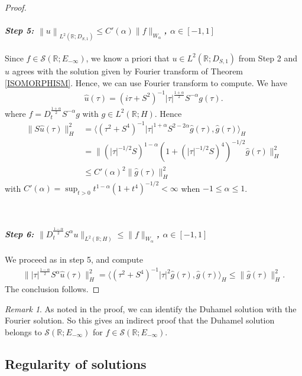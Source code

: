 \documentclass[11pt, letterpaper]{amsart}
\theoremstyle{definition}
\theoremstyle{remark}
\newtheorem{rem}[thm]{Remark}
\numberwithin{equation}{section}
\begin{document}
\begin{proof}
\paragraph{\textit{Step 5:  $\left\|u \right\|_{L^2(\mathbb{R}; D_{S,1})}\le C'(\alpha) \|f\|_{W_{\alpha}}$, $ \alpha\in [-1,1]$}}
Since $f\in \mathcal{S}(\mathbb{R}; E_{-\infty})$, we know a priori that $u\in L^2(\mathbb{R}; D_{S,1})$ from Step 2 and $u$ agrees with the solution given by Fourier transform of Theorem \ref{ISOMORPHISM}. Hence, we can use Fourier transform to compute. We have 
\begin{align*}
    \hat{u}(\tau) = ({i}\tau +S^2)^{-1} \left | \tau  \right |^{\frac{1+\alpha}{2} }S^{-\alpha}g(\tau).
\end{align*}
where $f=D_t^{\frac{1+\alpha}{2}}S^{-\alpha}g$ with $g\in L^2(\mathbb{R}; H)$.
Hence
\begin{align*}
    \|S\hat u(\tau)\|^2_H
&= \langle (\tau^2+S^4)^{-1} |\tau|^{1+\alpha}S^{2-2\alpha} \hat g(\tau), \hat g(\tau)
\rangle_H \\
&= \|(|\tau|^{-1/2}S)^{1-\alpha}(1+(|\tau|^{-1/2}S)^4)^{-1/2}\hat g(\tau)\|_H^2 
\\
&
\le C'(\alpha)^2 \|\hat g(\tau)\|_H
^2
\end{align*}
with $C'(\alpha)= \sup_{t>0} t^{1-\alpha}(1+t^4)^{-1/2}<\infty$ when $-1\le \alpha \le 1$.

\

\paragraph{\textit{Step 6:  $\|D_t^{\frac{1-\alpha}{2}}S^\alpha u\|_{L^2(\mathbb{R};H)}  \le  \|f\|_{W_{\alpha}}$, $ \alpha\in [-1,1]$}}

We proceed as in step 5, and compute
\begin{align*}
    \||\tau|^{\frac{1-\alpha}{2}}S^\alpha \hat u(\tau)\|^2_H
= \langle (\tau^2+S^4)^{-1} |\tau|^{2} \hat g(\tau), \hat g(\tau)
\rangle_H 
\le  \|\hat g(\tau)\|_H
^2.
\end{align*}
 The conclusion follows. 
 \end{proof}


\begin{rem}
     As noted in the proof, we can identify the Duhamel solution with the Fourier solution. So this gives an indirect proof that the Duhamel solution belongs to 
     $\mathcal{S}(\mathbb{R}; E_{-\infty})$ for $f\in \mathcal{S}(\mathbb{R}; E_{-\infty}).$
\end{rem}
\subsection{Regularity of solutions}
\end{document}
